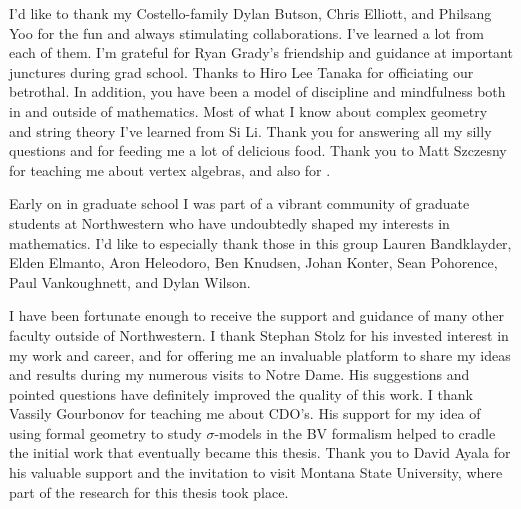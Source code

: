 I'd like to thank my Costello-family Dylan Butson, Chris Elliott, and Philsang Yoo for the fun and always stimulating collaborations. 
I've learned a lot from each of them. 
I'm grateful for Ryan Grady's friendship and guidance at important junctures during grad school. 
Thanks to Hiro Lee Tanaka for officiating our betrothal.
In addition, you have been a model of discipline and mindfulness both in and outside of mathematics.
Most of what I know about complex geometry and string theory I've learned from Si Li. 
Thank you for answering all my silly questions and for feeding me a lot of delicious food. 
Thank you to Matt Szczesny for teaching me about vertex algebras, and also for .

Early on in graduate school I was part of a vibrant community of graduate students at Northwestern who have undoubtedly shaped my interests in mathematics.
I'd like to especially thank those in this group Lauren Bandklayder, Elden Elmanto, Aron Heleodoro, Ben Knudsen, Johan Konter, Sean Pohorence, Paul Vankoughnett, and Dylan Wilson. 

I have been fortunate enough to receive the support and guidance of many other faculty outside of Northwestern. 
I thank Stephan Stolz for his invested interest in my work and career, and for offering me an invaluable platform to share my ideas and results during my numerous visits to Notre Dame. 
His suggestions and pointed questions have definitely improved the quality of this work. 
I thank Vassily Gourbonov for teaching me about CDO's.
His support for my idea of using formal geometry to study $\sigma$-models in the BV formalism helped to cradle the initial work that eventually became this thesis.
Thank you to David Ayala for his valuable support and the invitation to visit Montana State University, where part of the research for this thesis took place. 
